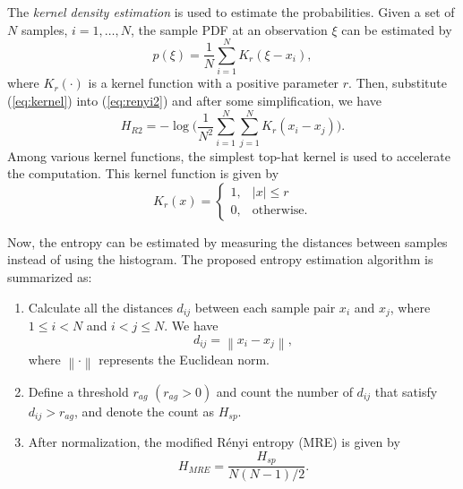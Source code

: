\documentclass[journal,comsoc,onecolumn, 12pt,draftclsnofoot]{IEEEtran}
\begin{document}
The \textit{kernel density estimation} is used to estimate the probabilities.
Given a set of \(N\) samples, \(i=1, \dots, N\), the sample PDF at an observation \(\xi\) can be estimated by~\cite{Principe2000a}
\begin{equation}
{ p(\xi)={\frac {1}{N}}\sum _{i=1}^{N}K_{r}\left(\xi-x_i\right)},
\label{eq:kernel}
\end{equation}
where $K_r(\cdot)$ is a kernel function with a positive parameter $r$.
Then, substitute (\ref{eq:kernel}) into (\ref{eq:renyi2}) and after some simplification, we have
\begin{equation}
H_{R2 }=-\log {\Bigg (}\frac{1}{N^2}\sum _{i=1}^{N}\sum _{j=1}^{N}K_{r}\left(x_i-x_j\right){\Bigg )}.
\end{equation}
Among various kernel functions, the simplest top-hat kernel is used to accelerate the computation.
This kernel function is given by
\begin{equation}
{\displaystyle K_{r}(x)={\begin{cases}1,&|x|\leq r\\0,&{\mbox{otherwise.}}\end{cases}}}
\end{equation}

Now, the entropy can be estimated by  measuring the distances between samples instead of using the histogram.
The proposed entropy estimation algorithm is summarized as:
\begin{enumerate}
\item Calculate all the distances \(d_{ij}\) between each sample pair \(x_i\) and \(x_j\), where \(1\le i<N\) and \( i<j \le N\). We have
 \begin{equation}
d_{ij}=\left\|x_i-x_j \right\|,
\label{eq:distance}
\end{equation}
where \(\left\| \cdot \right\|\) represents the Euclidean norm.
\item Define a threshold \(r_{ag}\) \((r_{ag}>0)\) and count the number of \(d_{ij}\) that satisfy $d_{ij}>r_{ag}$, and denote the count as $H_{sp}$.
\item After normalization, the modified R\'enyi entropy (MRE) is given by
\begin{equation}
H_{MRE}= \frac{ H_{sp}}{ N(N-1)/2}.
\label{eq:entorpy_ad}
\end{equation}
\end{enumerate}
\end{document}

